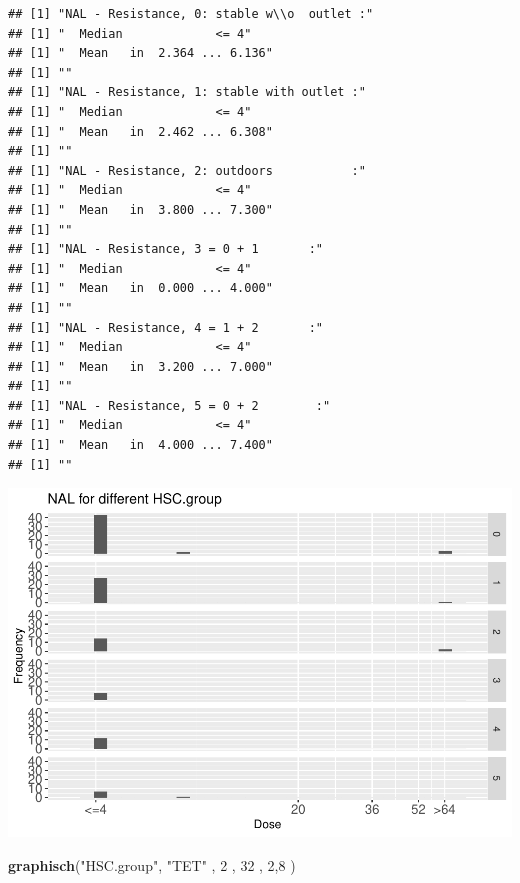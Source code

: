 \documentclass[
]{article}
\newenvironment{Shaded}{\begin{snugshade}}{\end{snugshade}}
\newcommand{\DecValTok}[1]{\textcolor[rgb]{0.00,0.00,0.81}{#1}}
\newcommand{\KeywordTok}[1]{\textcolor[rgb]{0.13,0.29,0.53}{\textbf{#1}}}
\newcommand{\NormalTok}[1]{#1}
\newcommand{\StringTok}[1]{\textcolor[rgb]{0.31,0.60,0.02}{#1}}
\begin{document}
\begin{verbatim}
## [1] "NAL - Resistance, 0: stable w\\o  outlet :"
## [1] "  Median             <= 4"
## [1] "  Mean   in  2.364 ... 6.136"
## [1] ""
## [1] "NAL - Resistance, 1: stable with outlet :"
## [1] "  Median             <= 4"
## [1] "  Mean   in  2.462 ... 6.308"
## [1] ""
## [1] "NAL - Resistance, 2: outdoors           :"
## [1] "  Median             <= 4"
## [1] "  Mean   in  3.800 ... 7.300"
## [1] ""
## [1] "NAL - Resistance, 3 = 0 + 1       :"
## [1] "  Median             <= 4"
## [1] "  Mean   in  0.000 ... 4.000"
## [1] ""
## [1] "NAL - Resistance, 4 = 1 + 2       :"
## [1] "  Median             <= 4"
## [1] "  Mean   in  3.200 ... 7.000"
## [1] ""
## [1] "NAL - Resistance, 5 = 0 + 2        :"
## [1] "  Median             <= 4"
## [1] "  Mean   in  4.000 ... 7.400"
## [1] ""
\end{verbatim}

\includegraphics{Verteilungen_files/figure-latex/unnamed-chunk-53-1.pdf}

\begin{Shaded}
\begin{Highlighting}[]
   \KeywordTok{graphisch}\NormalTok{(}\StringTok{"HSC.group"}\NormalTok{, }\StringTok{"TET"}\NormalTok{ , }\DecValTok{2}\NormalTok{    ,  }\DecValTok{32}\NormalTok{   ,   }\DecValTok{2}\NormalTok{,}\DecValTok{8}\NormalTok{    ) }
\end{Highlighting}
\end{Shaded}
\end{document}
